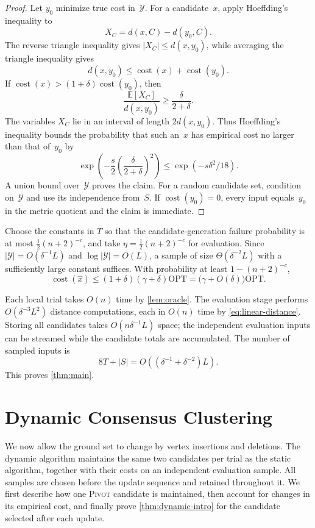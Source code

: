 \documentclass[11pt,letterpaper]{article}
\theoremstyle{definition}
\theoremstyle{remark}
\newcommand{\OPT}{\mathrm{OPT}}
\newcommand{\cost}{\operatorname{cost}}
\newcommand{\E}{\mathbb{E}}
\newcommand{\1}{\mathbf{1}}
\newcommand{\Pivot}{\textnormal{\textsc{Pivot}}}
\begin{document}
\begin{proof}
Let $y_0$ minimize true cost in~$\mathcal Y$.  For a candidate~$x$, apply Hoeffding's inequality to
\[
 X_C=d(x,C)-d(y_0,C).
\]
The reverse triangle inequality gives $|X_C|\le d(x,y_0)$, while averaging the triangle inequality gives
\[
 d(x,y_0)\le\cost(x)+\cost(y_0).
\]
If $\cost(x)>(1+\delta)\cost(y_0)$, then
\[
 \frac{\E[X_C]}{d(x,y_0)}
 \ge\frac{\delta}{2+\delta}.
\]
The variables $X_C$ lie in an interval of length $2d(x,y_0)$.  Thus Hoeffding's inequality bounds the probability that such an~$x$ has empirical cost no larger than that of~$y_0$ by
\[
 \exp\!\left(-\frac{s}{2}\left(\frac{\delta}{2+\delta}\right)^2\right)
 \le \exp(-s\delta^2/18).
\]
A union bound over~$\mathcal Y$ proves the claim.  For a random candidate set, condition on~$\mathcal Y$ and use its independence from~$S$.  If $\cost(y_0)=0$, every input equals~$y_0$ in the metric quotient and the claim is immediate.
\end{proof}

Choose the constants in $T$ so that the candidate-generation failure probability is at most $\tfrac12(n+2)^{-c}$, and take $\eta=\tfrac12(n+2)^{-c}$ for evaluation.  Since $|\mathcal Y|=O(\delta^{-1}L)$ and $\log|\mathcal Y|=O(L)$, a sample of size $\Theta(\delta^{-2}L)$ with a sufficiently large constant suffices.  With probability at least $1-(n+2)^{-c}$,
\[
 \cost(\widehat x)
 \le(1+\delta)(\gamma+\delta)\OPT
 =\bigl(\gamma+O(\delta)\bigr)\OPT.
\]

Each local trial takes $O(n)$ time by \cref{lem:oracle}.  The evaluation stage performs
$O(\delta^{-3}L^2)$ distance computations, each in $O(n)$ time by \cref{eq:linear-distance}.  Storing all candidates takes $O(n\delta^{-1}L)$ space; the independent evaluation inputs can be streamed while the candidate totals are accumulated.  The number of sampled inputs is
\[
 8T+|S|=O\!\left((\delta^{-1}+\delta^{-2})L\right).
\]
This proves \cref{thm:main}.

\section{Dynamic Consensus Clustering}
\label{sec:dynamic}

We now allow the ground set to change by vertex insertions and deletions.  The dynamic algorithm maintains the same two candidates per trial as the static algorithm, together with their costs on an independent evaluation sample.  All samples are chosen before the update sequence and retained throughout it.  We first describe how one \Pivot{} candidate is maintained, then account for changes in its empirical cost, and finally prove \cref{thm:dynamic-intro} for the candidate selected after each update.
\end{document}
